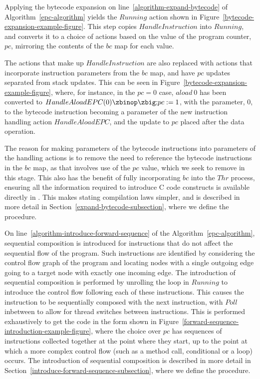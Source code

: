 Applying the bytecode expansion on
line~\ref{algorithm-expand-bytecode} of Algorithm~\ref{epc-algorithm}
yields the $Running$ action shown in
Figure~\ref{bytecode-expansion-example-figure}.
This step copies $HandleInstruction$ into $Running$, and converts it
to a choice of actions based on the value of the program counter,
$pc$, mirroring the contents of the $bc$ map for each value.

The actions that make up $HandleInstruction$ are also replaced with
actions that incorporate instruction parameters from the $bc$ map, and
have $pc$ updates separated from stack updates.
This can be seen in Figure~\ref{bytecode-expansion-example-figure},
where, for instance, in the $pc = 0$ case, $aload~0$ has been
converted to $HandleAloadEPC(0) \circseq pc := 1$, with the parameter,
$0$, to the bytecode instruction becoming a parameter of the new
instruction handling action $HandleAloadEPC$, and the update to $pc$
placed after the data operation.

The reason for making parameters of the bytecode instructions into
parameters of the handling actions is to remove the need to reference
the bytecode instructions in the $bc$ map, as that involves use of the
$pc$ value, which we seek to remove in this stage.
This also has the benefit of fully incorporating $bc$ into the $Thr$
process, ensuring all the information required to introduce C code
constructs is available directly in \Circus{}.
This makes stating compilation laws simpler, and is described in more
detail in Section~\ref{expand-bytecode-subsection}, where we define
the  procedure.

On line~\ref{algorithm-introduce-forward-sequence} of the
Algorithm~\ref{epc-algorithm}, sequential composition is introduced
for instructions that do not affect the sequential flow of the
program.
Such instructions are identified by considering the control flow graph
of the program and locating nodes with a single outgoing edge going to
a target node with exactly one incoming edge.
The introduction of sequential composition is performed by unrolling
the loop in $Running$ to introduce the control flow following each of
these instructions.
This causes the instruction to be sequentially composed with the next
instruction, with $Poll$ inbetween to allow for thread switches
between instructions.
This is performed exhaustively to get the code in the form shown in
Figure~\ref{forward-sequence-introduction-example-figure}, where the
choice over $pc$ has sequences of instructions collected together at
the point where they start, up to the point at which a more complex
control flow (such as a method call, conditional or a loop) occurs.
The introduction of sequential composition is described in more detail
in Section~\ref{introduce-forward-sequence-subsection}, where we
define the  procedure.

